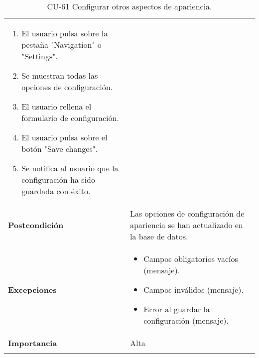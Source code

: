 \begin{longtable}[]{@{}ll@{}}
\begin{minipage}[t]{0.72\columnwidth}
\begin{enumerate}
\def\labelenumi{\arabic{enumi}.}
\tightlist
\item
  El usuario pulsa sobre la pestaña "Navigation" o "Settings".
\item
  Se muestran todas las opciones de configuración.
\item
  El usuario rellena el formulario de configuración.
\item
  El usuario pulsa sobre el botón "Save changes".
\item
  Se notifica al usuario que la configuración ha sido guardada con
  éxito.
\end{enumerate}\strut
\end{minipage}\tabularnewline
\begin{minipage}[t]{0.22\columnwidth}\raggedright
\textbf{Postcondición}\strut
\end{minipage} & \begin{minipage}[t]{0.72\columnwidth}\raggedright
Las opciones de configuración de apariencia se han actualizado en la
base de datos.\strut
\end{minipage}\tabularnewline
\begin{minipage}[t]{0.22\columnwidth}\raggedright
\textbf{Excepciones}\strut
\end{minipage} & \begin{minipage}[t]{0.72\columnwidth}\raggedright
\begin{itemize}
\tightlist
\item
  Campos obligatorios vacíos (mensaje).
\item
  Campos inválidos (mensaje).
\item
  Error al guardar la configuración (mensaje).
\end{itemize}\strut
\end{minipage}\tabularnewline
\begin{minipage}[t]{0.22\columnwidth}\raggedright
\textbf{Importancia}\strut
\end{minipage} & \begin{minipage}[t]{0.72\columnwidth}\raggedright
Alta\strut
\end{minipage}\tabularnewline
\bottomrule
\caption{CU-61 Configurar otros aspectos de apariencia.}
\end{longtable}

